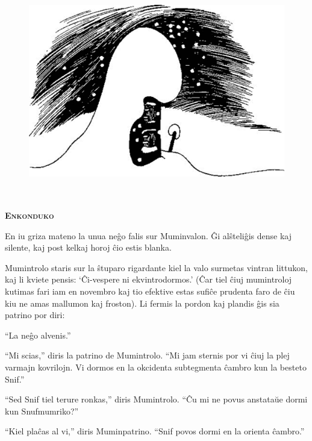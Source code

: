 \chapter[Enkonduko]{}


\begin{figure}[htbp]
\centering
\includegraphics[width=400pt,height=268pt]{_1.jpg}
\caption{}
\label{_1}
\end{figure}

\begin{center}\textbf{\Large\color{ForestGreen}\textsc{Enkonduko}}\end{center}

\noindent En iu griza mateno la unua neĝo falis sur Muminvalon. Ĝi alŝteliĝis dense kaj silente, kaj post kelkaj horoj ĉio estis blanka.

Mumintrolo staris sur la ŝtuparo rigardante kiel la valo surmetas vintran littukon, kaj li kviete pensis: `Ĉi-vespere ni ekvintrodormos.' (Ĉar tiel ĉiuj mumintroloj kutimas fari iam en novembro kaj tio efektive estas sufiĉe prudenta faro de ĉiu kiu ne amas mallumon kaj froston). Li fermis la pordon kaj plandis ĝis sia patrino por diri:

``La neĝo alvenis.''

``Mi scias,'' diris la patrino de Mumintrolo. ``Mi jam sternis por vi ĉiuj la plej varmajn kovrilojn. Vi dormos en la okcidenta subtegmenta ĉambro kun la besteto Snif.''

``Sed Snif tiel terure ronkas,'' diris Mumintrolo. ``Ĉu mi ne povus anstataŭe dormi kun Snufmumriko?''

``Kiel plaĉas al vi,'' diris Muminpatrino. ``Snif povos dormi en la orienta ĉambro.''

